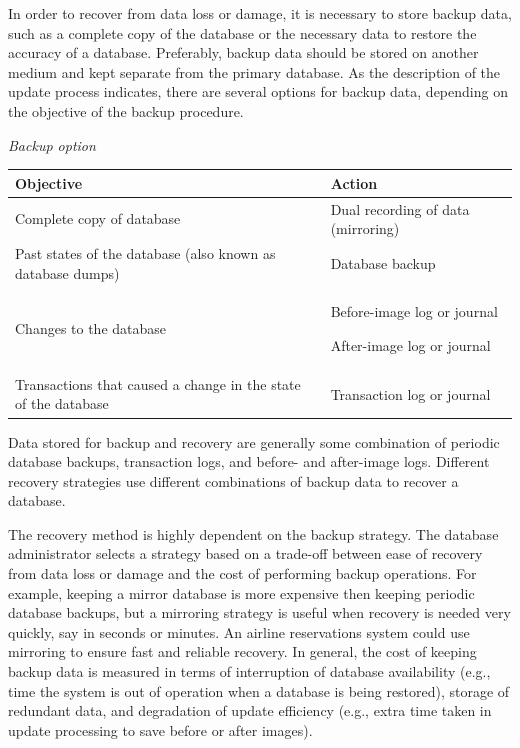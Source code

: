 \documentclass[
]{article}
\begin{document}
In order to recover from data loss or damage, it is necessary to store
backup data, such as a complete copy of the database or the necessary
data to restore the accuracy of a database. Preferably, backup data
should be stored on another medium and kept separate from the primary
database. As the description of the update process indicates, there are
several options for backup data, depending on the objective of the
backup procedure.

\emph{Backup option}

\begin{longtable}[]{@{}
  >{\raggedright\arraybackslash}p{}
  >{\raggedright\arraybackslash}p{}@{}}
\toprule
Objective & Action \\
\midrule
\endhead
Complete copy of database & Dual recording of data
(mirroring) \\
Past states of the database (also
known as database dumps) & Database backup \\
Changes to the database & Before-image log or journal

After-image log or journal \\
Transactions that caused a change
in the state of the database & Transaction log or journal \\
\bottomrule
\end{longtable}

Data stored for backup and recovery are generally some combination of
periodic database backups, transaction logs, and before- and after-image
logs. Different recovery strategies use different combinations of backup
data to recover a database.

The recovery method is highly dependent on the backup strategy. The
database administrator selects a strategy based on a trade-off between
ease of recovery from data loss or damage and the cost of performing
backup operations. For example, keeping a mirror database is more
expensive then keeping periodic database backups, but a mirroring
strategy is useful when recovery is needed very quickly, say in seconds
or minutes. An airline reservations system could use mirroring to ensure
fast and reliable recovery. In general, the cost of keeping backup data
is measured in terms of interruption of database availability (e.g.,
time the system is out of operation when a database is being restored),
storage of redundant data, and degradation of update efficiency (e.g.,
extra time taken in update processing to save before or after images).
\end{document}
